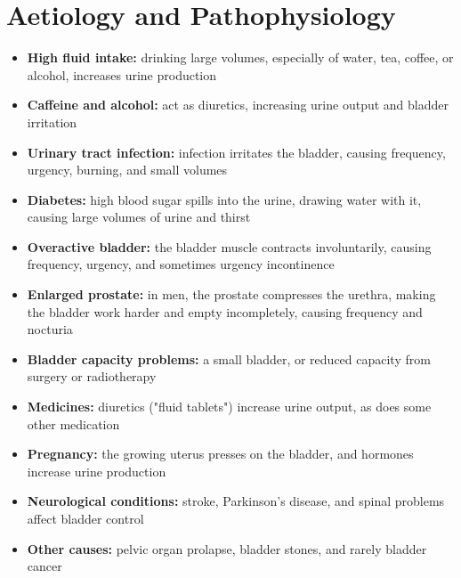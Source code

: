 \section*{Aetiology and Pathophysiology}
\begin{itemize}
    \item \textbf{High fluid intake:} drinking large volumes, especially of water, tea, coffee, or alcohol, increases urine production
    \item \textbf{Caffeine and alcohol:} act as diuretics, increasing urine output and bladder irritation
    \item \textbf{Urinary tract infection:} infection irritates the bladder, causing frequency, urgency, burning, and small volumes
    \item \textbf{Diabetes:} high blood sugar spills into the urine, drawing water with it, causing large volumes of urine and thirst
    \item \textbf{Overactive bladder:} the bladder muscle contracts involuntarily, causing frequency, urgency, and sometimes urgency incontinence
    \item \textbf{Enlarged prostate:} in men, the prostate compresses the urethra, making the bladder work harder and empty incompletely, causing frequency and nocturia
    \item \textbf{Bladder capacity problems:} a small bladder, or reduced capacity from surgery or radiotherapy
    \item \textbf{Medicines:} diuretics ("fluid tablets") increase urine output, as does some other medication
    \item \textbf{Pregnancy:} the growing uterus presses on the bladder, and hormones increase urine production
    \item \textbf{Neurological conditions:} stroke, Parkinson's disease, and spinal problems affect bladder control
    \item \textbf{Other causes:} pelvic organ prolapse, bladder stones, and rarely bladder cancer
\end{itemize}

